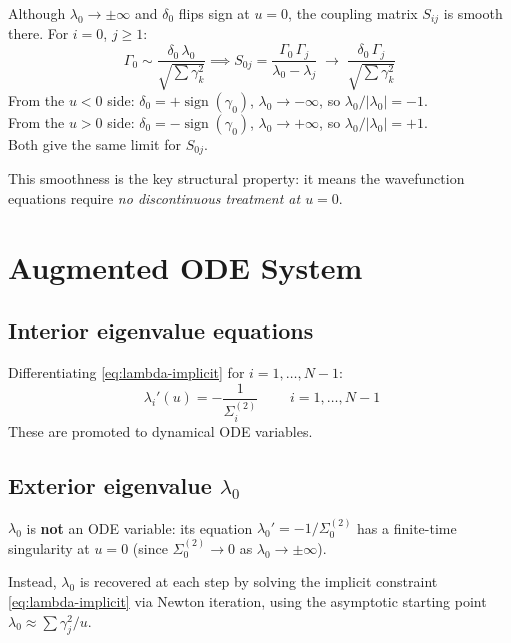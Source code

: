 \documentclass[11pt]{article}
\begin{document}
Although $\lambda_0 \to \pm\infty$ and $\delta_0$ flips sign at $u=0$, the coupling matrix $S_{ij}$ is smooth there.  For $i=0$, $j\geq 1$:
\[
  \Gamma_0 \sim \frac{\delta_0\,\lambda_0}{\sqrt{\sum\gamma_k^2}}
  \implies
  S_{0j} = \frac{\Gamma_0\,\Gamma_j}{\lambda_0 - \lambda_j}
  \;\to\; \frac{\delta_0\,\Gamma_j}{\sqrt{\sum\gamma_k^2}}
\]
From the $u<0$ side: $\delta_0 = +\operatorname{sign}(\gamma_0)$, $\lambda_0 \to -\infty$, so $\lambda_0/|\lambda_0| = -1$.\\
From the $u>0$ side: $\delta_0 = -\operatorname{sign}(\gamma_0)$, $\lambda_0 \to +\infty$, so $\lambda_0/|\lambda_0| = +1$.\\
Both give the same limit for $S_{0j}$.

This smoothness is the key structural property: it means the wavefunction equations require \emph{no discontinuous treatment at $u=0$}.

\section{Augmented ODE System}

\subsection{Interior eigenvalue equations}

Differentiating \eqref{eq:lambda-implicit} for $i = 1,\dots,N{-}1$:
\begin{equation}\label{eq:lambda-ode}
  \boxed{\;
    \lambda_i'(u) = -\frac{1}{\Sigma^{(2)}_i}
  \;}
  \qquad i = 1,\dots,N{-}1
\end{equation}
These are promoted to dynamical ODE variables.

\subsection{Exterior eigenvalue $\lambda_0$}

$\lambda_0$ is \textbf{not} an ODE variable: its equation $\lambda_0' = -1/\Sigma^{(2)}_0$ has a finite-time singularity at $u=0$ (since $\Sigma^{(2)}_0 \to 0$ as $\lambda_0 \to \pm\infty$).

Instead, $\lambda_0$ is recovered at each step by solving the implicit constraint \eqref{eq:lambda-implicit} via Newton iteration, using the asymptotic starting point $\lambda_0 \approx \sum\gamma_j^2 / u$.
\end{document}
